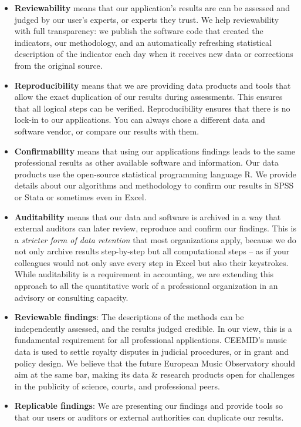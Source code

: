\documentclass[
  a4paper,
  openany, a4paper, oneside]{book}
\begin{document}
\begin{itemize}
\item
  \textbf{Reviewability} means that our application's results are can be assessed and judged by our user's experts, or experts they trust. We help reviewability with full transparency: we publish the software code that created the indicators, our methodology, and an automatically refreshing statistical description of the indicator each day when it receives new data or corrections from the original source.
\item
  \textbf{Reproducibility} means that we are providing data products and tools that allow the exact duplication of our results during assessments. This ensures that all logical steps can be verified. Reproducibility ensures that there is no lock-in to our applications. You can always chose a different data and software vendor, or compare our results with them.
\item
  \textbf{Confirmability} means that using our applications findings leads to the same professional results as other available software and information. Our data products use the open-source statistical programming language R. We provide details about our algorithms and methodology to confirm our results in SPSS or Stata or sometimes even in Excel.
\item
  \textbf{Auditability} means that our data and software is archived in a way that external auditors can later review, reproduce and confirm our findings. This is a \emph{stricter form of data retention} that most organizations apply, because we do not only archive results step-by-step but all computational steps -- as if your colleagues would not only save every step in Excel but also their keystrokes. While auditability is a requirement in accounting, we are extending this approach to all the quantitative work of a professional organization in an advisory or consulting capacity.
\item
  \textbf{Reviewable findings}: The descriptions of the methods can be independently assessed, and the results judged credible. In our view, this is a fundamental requirement for all professional applications. CEEMID's music data is used to settle royalty disputes in judicial procedures, or in grant and policy design. We believe that the future European Music Observatory should aim at the same bar, making its data \& research products open for challenges in the publicity of science, courts, and professional peers.
\item
  \textbf{Replicable findings}: We are presenting our findings and provide tools so that our users or auditors or external authorities can duplicate our results.

\end{itemize}
\end{document}
